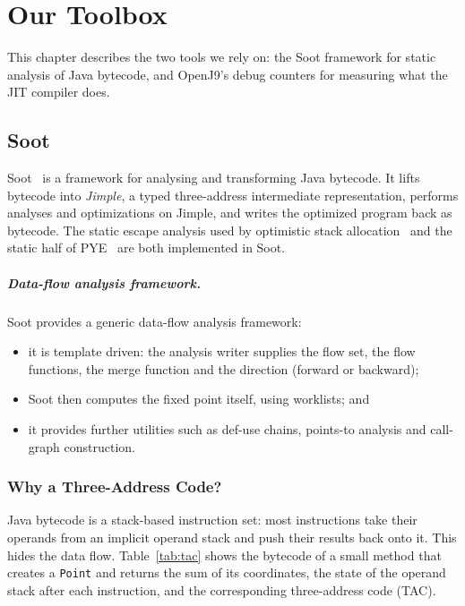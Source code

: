 \chapter{Our Toolbox}
\label{ch:toolbox}

This chapter describes the two tools we rely on: the Soot framework for static analysis of Java
bytecode, and OpenJ9's debug counters for measuring what the JIT compiler does.

\section{Soot}

Soot~\cite{vallee2010soot} is a framework for analysing and transforming Java bytecode. It lifts
bytecode into \emph{Jimple}, a typed three-address intermediate representation, performs
analyses and optimizations on Jimple, and writes the optimized program back as bytecode. The
static escape analysis used by optimistic stack allocation~\cite{anand2024optimistic} and the
static half of PYE~\cite{thakur2019pye} are both implemented in Soot.

\paragraph{Data-flow analysis framework.} Soot provides a generic data-flow analysis framework:
\begin{itemize}
  \item it is template driven: the analysis writer supplies the flow set, the flow functions, the
        merge function and the direction (forward or backward);
  \item Soot then computes the fixed point itself, using worklists; and
  \item it provides further utilities such as def-use chains, points-to analysis and call-graph
        construction.
\end{itemize}

\subsection{Why a Three-Address Code?}

Java bytecode is a stack-based instruction set: most instructions take their operands from an
implicit operand stack and push their results back onto it. This hides the data flow.
Table~\ref{tab:tac} shows the bytecode of a small method that creates a \texttt{Point} and
returns the sum of its coordinates, the state of the operand stack after each instruction, and
the corresponding three-address code (TAC).

